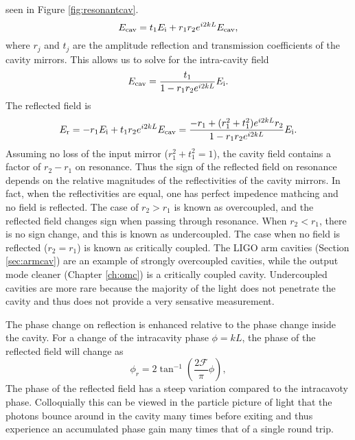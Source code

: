  seen in Figure \ref{fig:resonantcav}.
\begin{equation}
E_{\rm{cav}}=t_1 E_{\rm i} + r_1 r_2 e^{i 2 k L} E_{\rm{cav}},
\end{equation}
where $r_j$ and $t_j$ are the amplitude reflection and transmission coefficients of the cavity mirrors. %
This allows us to solve for the intra-cavity field
\begin{equation}
E_{\rm{cav}}=\frac{t_1}{1 - r_1 r_2 e^{i 2 k L}} E_{\rm i}.
\end{equation}
The reflected field is
\begin{equation}
E_{\rm{r}}=-r_1 E_{\rm i} + t_1r_2 e^{i 2 k L} E_{\rm{cav}}=\frac{-r_1+(r_1^2+t_1^2)e^{i2kL}r_2}{1-r_1r_2e^{i2kL}}E_{\rm i}.
\end{equation}
Assuming no loss of the input mirror ($r_1^2+t_1^2=1$), the cavity field contains a factor of $r_2-r_1$ on resonance. %
Thus the sign of the reflected field on resonance depends on the relative magnitudes of the reflectivities of the cavity mirrors. %
In fact, when the reflectivities are equal, one has perfect impedence mathcing and no field is reflected. %
The case of $r_2>r_1$ is known as overcoupled, and the reflected field changes sign when passing through resonance. %
When $r_2<r_1$, there is no sign change, and this is known as undercoupled. %
The case when no field is reflected ($r_2=r_1$) is known as critically coupled. %
The LIGO arm cavities (Section \ref{sec:armcav}) are an example of strongly overcoupled cavities, while the output mode cleaner (Chapter \ref{ch:omc}) is a critically coupled cavity. %
Undercoupled cavities are more rare because the majority of the light does not penetrate the cavity and thus does not provide a very sensative measurement.

The phase change on reflection is enhanced relative to the phase change inside the cavity. %
For a change of the intracavity phase $\phi = k L$, the phase of the reflected field will change as
\begin{equation}
\phi_r=2\tan^{-1}\left(\frac{2\mathcal{F}}{\pi}\phi\right),
\end{equation}
 The phase of the reflected field has a steep variation compared to the intracavoty phase. Colloquially this can be viewed in the particle picture of light that the photons bounce around in the cavity many times before exiting and thus experience an accumulated phase gain many times that of a single round trip.

